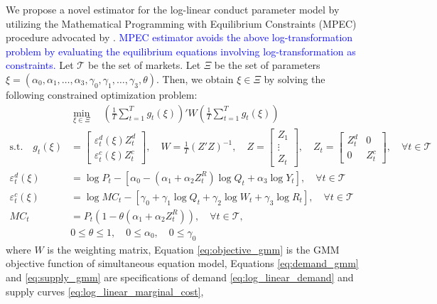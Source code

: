 \documentclass[11pt, a4paper]{article}
\begin{document}
We propose a novel estimator for the log-linear conduct parameter model by utilizing the Mathematical Programming with Equilibrium Constraints (MPEC) procedure advocated by \cite{su2012constrained}. \textcolor{blue}{MPEC estimator avoids the above log-transformation problem by evaluating the equilibrium equations involving log-transformation as constraints.} Let $\mathcal{T}$ be the set of markets. Let $\Xi$ be the set of parameters $\xi = (\alpha_0,\alpha_1, \ldots, \alpha_3, \gamma_0,\gamma_1, \ldots, \gamma_3, \theta)$. Then, we obtain $\xi\in \Xi$ by solving the following constrained optimization problem:
\begin{align}
    &\min_{\xi \in \Xi}\quad \left(\frac{1}{T}\sum_{t=1}^{T}g_{t}(\xi)\right)' W\left(\frac{1}{T}\sum_{t=1}^{T}g_{t}(\xi)\right) \label{eq:objective_gmm}\\
    \text{s.t.}\quad g_{t}(\xi)&=\left[\begin{array}{l}
\varepsilon^{d}_{t}(\xi)Z_{t}^{d} \\
\varepsilon^{c}_{t}(\xi)Z_{t}^{c}
\end{array}\right], \quad W=\frac{1}{T}(Z'Z)^{-1}, \quad Z=\left[\begin{array}{c}
Z_{1} \\
\vdots \\
Z_{t}
\end{array}\right],\quad Z_{t}=\left[\begin{array}{ll}
Z_{t}^{d} & 0 \\
0 & Z_{t}^{c}
\end{array}\right],\quad  \forall t \in \mathcal{T}\nonumber\\
    \varepsilon^{d}_{t}(\xi)&=\log P_{t} -[\alpha_0 - (\alpha_1 + \alpha_2 Z^{R}_{t}) \log Q_t + \alpha_3 \log Y_t],\quad  \forall t \in \mathcal{T} \label{eq:demand_gmm}\\
    \varepsilon^{c}_{t} (\xi)&= \log MC_t -[\gamma_0 + \gamma_1 \log Q_t +  \gamma_2 \log W_{t} + \gamma_3 \log R_t],\quad  \forall t \in \mathcal{T}\label{eq:supply_gmm}\\
    MC_t &= P_t(1 - \theta (\alpha_1 + \alpha_2 Z^{R}_{t})),\quad  \forall t \in \mathcal{T},\label{eq:equilibrium_constraint}\\
    &0\le\theta \le 1,\quad  0 \le \alpha_0,\quad  0\le \gamma_0 \label{eq:parameter_constraint}
\end{align}
where $W$ is the weighting matrix, Equation \eqref{eq:objective_gmm} is the GMM objective function of simultaneous equation model, 
Equations \eqref{eq:demand_gmm} and \eqref{eq:supply_gmm} are specifications of demand \eqref{eq:log_linear_demand} and supply curves \eqref{eq:log_linear_marginal_cost}, 
\end{document}
